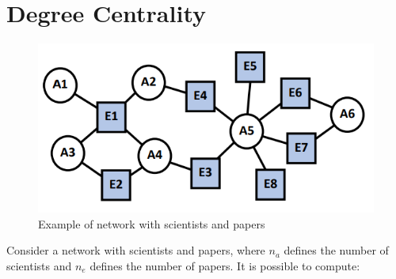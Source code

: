 \documentclass[
  notitlepage,
  onecolumn,
  openany]{book}
\begin{document}
\hypertarget{degree-centrality-2}{%
\section{Degree Centrality}\label{degree-centrality-2}}

\begin{figure}[h!]

{\centering \includegraphics[width=0.4\linewidth]{images/10-Two mode networks/Untitled 4} 

}

\caption{Example of network with scientists and papers}\label{fig:unnamed-chunk-63}
\end{figure}

Consider a network with scientists and papers, where \(n_a\) defines the number of scientists and \(n_e\) defines the number of papers. It is possible to compute:
\end{document}
